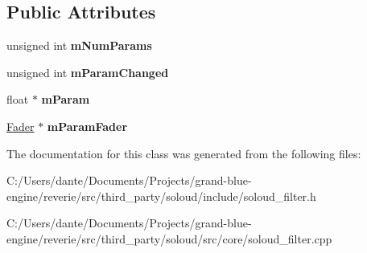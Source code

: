 \subsection*{Public Attributes}
\begin{DoxyCompactItemize}
\item 
\mbox{\label{class_so_loud_1_1_filter_instance_a3543039db3c00cd19b7d01b82c29d824}} 
unsigned int {\bfseries m\+Num\+Params}
\item 
\mbox{\label{class_so_loud_1_1_filter_instance_a4ed9e55584ed2ae59e3de878dfa8c506}} 
unsigned int {\bfseries m\+Param\+Changed}
\item 
\mbox{\label{class_so_loud_1_1_filter_instance_ab60599cfa1fcdf09e1a5753399e04048}} 
float $\ast$ {\bfseries m\+Param}
\item 
\mbox{\label{class_so_loud_1_1_filter_instance_ab30e49b98d87f106fc1202793120cac7}} 
\mbox{\hyperlink{class_so_loud_1_1_fader}{Fader}} $\ast$ {\bfseries m\+Param\+Fader}
\end{DoxyCompactItemize}


The documentation for this class was generated from the following files\+:\begin{DoxyCompactItemize}
\item 
C\+:/\+Users/dante/\+Documents/\+Projects/grand-\/blue-\/engine/reverie/src/third\+\_\+party/soloud/include/soloud\+\_\+filter.\+h\item 
C\+:/\+Users/dante/\+Documents/\+Projects/grand-\/blue-\/engine/reverie/src/third\+\_\+party/soloud/src/core/soloud\+\_\+filter.\+cpp\end{DoxyCompactItemize}
